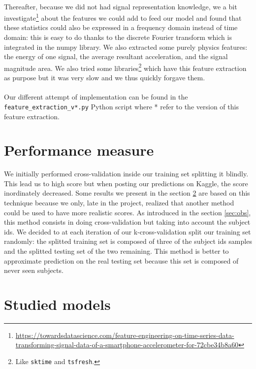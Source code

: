 \documentclass[a4paper, 11pt, oneside]{article}
\begin{document}
\paragraph{}Thereafter, because we did not had signal representation knowledge, we a bit investigate\footnote{\url{https://towardsdatascience.com/feature-engineering-on-time-series-data-transforming-signal-data-of-a-smartphone-accelerometer-for-72cbe34b8a60}} about the features we could add to feed our model and found that these statistics could also be expressed in a frequency domain instead of time domain: this is easy to do thanks to the discrete Fourier transform which is integrated in the numpy library.
We also extracted some purely physics features: the energy of one signal, the average resultant acceleration, and the signal magnitude area. We also tried some libraries\footnote{Like \texttt{sktime} and \texttt{tsfresh}.} which have this feature extraction as purpose but it was very slow and we thus quickly forgave them.

\paragraph{}Our different attempt of implementation can be found in the \texttt{feature\_extraction\_v*.py} Python script where * refer to the version of this feature extraction.

\section{Performance measure}
We initially performed cross-validation inside our training set splitting it blindly. This lead us to high score but when posting our predictions on Kaggle, the score inordinately decreased. Some results we present in the section \ref{sec:models} are based on this technique because we only, late in the project, realized that another method could be used to have more realistic scores.
As introduced in the section \ref{sec:obs}, this method consists in doing cross-validation but taking into account the subject ids. We decided to at each iteration of our k-cross-validation split our training set randomly: the splitted training set is composed of three of the subject ids samples and the splitted testing set of the two remaining. This method is better to approximate prediction on the real testing set because this set is composed of never seen subjects.

\section{Studied models} \label{sec:models}
\end{document}
